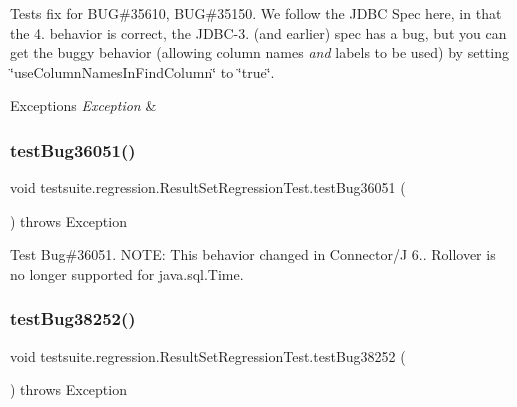 Tests fix for B\+UG\#35610, B\+UG\#35150. We follow the J\+D\+BC Spec here, in that the 4. behavior is correct, the J\+D\+B\+C-\/3. (and earlier) spec has a bug, but you can get the buggy behavior (allowing column names {\itshape and} labels to be used) by setting \char`\"{}use\+Column\+Names\+In\+Find\+Column\char`\"{} to \char`\"{}true\char`\"{}.


\begin{DoxyExceptions}{Exceptions}
{\em Exception} & \\
\hline
\end{DoxyExceptions}
\mbox{\label{classtestsuite_1_1regression_1_1_result_set_regression_test_aabff0fcb9864462c3e2572817774d404}} 
\subsubsection{\texorpdfstring{test\+Bug36051()}{testBug36051()}}
{\footnotesize\ttfamily void testsuite.\+regression.\+Result\+Set\+Regression\+Test.\+test\+Bug36051 (\begin{DoxyParamCaption}{ }\end{DoxyParamCaption}) throws Exception}

Test Bug\#36051. N\+O\+TE\+: This behavior changed in Connector/J 6.. Rollover is no longer supported for java.\+sql.\+Time. \mbox{\label{classtestsuite_1_1regression_1_1_result_set_regression_test_ae79fca0bd7d22ac046c30b0e69ae46e5}} 
\subsubsection{\texorpdfstring{test\+Bug38252()}{testBug38252()}}
{\footnotesize\ttfamily void testsuite.\+regression.\+Result\+Set\+Regression\+Test.\+test\+Bug38252 (\begin{DoxyParamCaption}{ }\end{DoxyParamCaption}) throws Exception}

